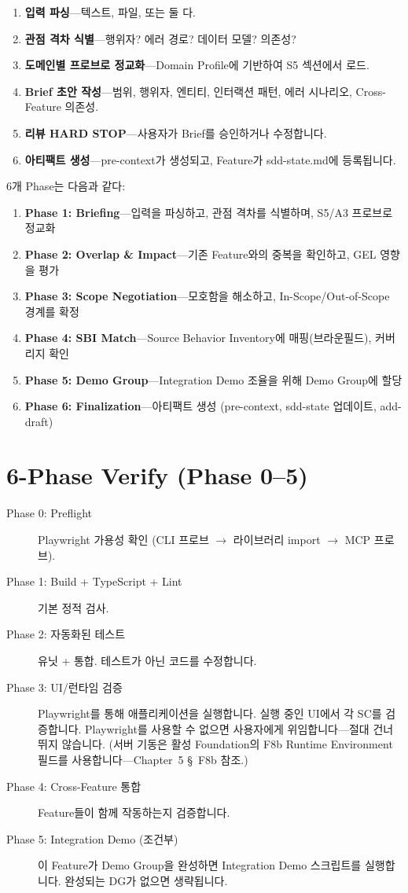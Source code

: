 \documentclass[11pt,a4paper,openright,twoside]{report}
\begin{document}
\begin{enumerate}
  \item \textbf{입력 파싱}---텍스트, 파일, 또는 둘 다.
  \item \textbf{관점 격차 식별}---행위자? 에러 경로? 데이터 모델? 의존성?
  \item \textbf{도메인별 프로브로 정교화}---Domain Profile에 기반하여 S5 섹션에서 로드.
  \item \textbf{Brief 초안 작성}---범위, 행위자, 엔티티, 인터랙션 패턴, 에러 시나리오, Cross-Feature 의존성.
  \item \textbf{리뷰 HARD STOP}---사용자가 Brief를 승인하거나 수정합니다.
  \item \textbf{아티팩트 생성}---pre-context가 생성되고, Feature가 sdd-state.md에 등록됩니다.
\end{enumerate}

6개 Phase는 다음과 같다:
\begin{enumerate}[nosep]
  \item \textbf{Phase 1: Briefing}---입력을 파싱하고, 관점 격차를 식별하며, S5/A3 프로브로 정교화
  \item \textbf{Phase 2: Overlap \& Impact}---기존 Feature와의 중복을 확인하고, GEL 영향을 평가
  \item \textbf{Phase 3: Scope Negotiation}---모호함을 해소하고, In-Scope/Out-of-Scope 경계를 확정
  \item \textbf{Phase 4: SBI Match}---Source Behavior Inventory에 매핑(브라운필드), 커버리지 확인
  \item \textbf{Phase 5: Demo Group}---Integration Demo 조율을 위해 Demo Group에 할당
  \item \textbf{Phase 6: Finalization}---아티팩트 생성 (pre-context, sdd-state 업데이트, add-draft)
\end{enumerate}

\section{6-Phase Verify (Phase 0--5)}

\begin{description}
  \item[Phase 0: Preflight] Playwright 가용성 확인 (CLI 프로브 $\rightarrow$ 라이브러리 import $\rightarrow$ MCP 프로브).
  \item[Phase 1: Build + TypeScript + Lint] 기본 정적 검사.
  \item[Phase 2: 자동화된 테스트] 유닛 + 통합. 테스트가 아닌 코드를 수정합니다.
  \item[Phase 3: UI/런타임 검증] Playwright를 통해 애플리케이션을 실행합니다. 실행 중인 UI에서 각 SC를 검증합니다. Playwright를 사용할 수 없으면 사용자에게 위임합니다---절대 건너뛰지 않습니다. (서버 기동은 활성 Foundation의 F8b Runtime Environment 필드를 사용합니다---Chapter~5 \S~F8b 참조.)
  \item[Phase 4: Cross-Feature 통합] Feature들이 함께 작동하는지 검증합니다.
  \item[Phase 5: Integration Demo (조건부)] 이 Feature가 Demo Group을 완성하면 Integration Demo 스크립트를 실행합니다. 완성되는 DG가 없으면 생략됩니다.
\end{description}
\end{document}
